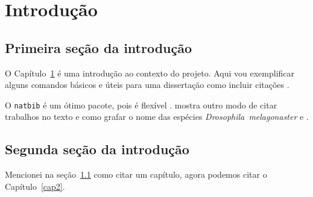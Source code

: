\cleardoublepage
\pagestyle{fancy}

\chapter{Introdução}\label{intro}
\section{Primeira seção da introdução}\label{intro:historico}

O Capítulo~\ref{intro} é uma introdução ao contexto do projeto.
Aqui vou exemplificar alguns comandos básicos e úteis para uma dissertação como incluir citações \citep{Sand-Jensen2007}.

O \texttt{natbib} é um ótimo pacote, pois é flexível \citep[ver detalhes em][]{Kirk2008}.
\citet{Emlet1987} mostra outro modo de citar trabalhos no texto e como grafar o nome das espécies \emph{Drosophila~melagonaster} e \subde.

\section{Segunda seção da introdução}\label{intro:contexto}

Mencionei na seção~\ref{intro:historico} como citar um capítulo, agora podemos citar o Capítulo~\ref{cap2}.


